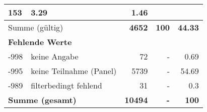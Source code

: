 \begin{longtable}{lXrrr}
       \num{153} &
       \num[round-mode=places,round-precision=2]{3.29} &
         \num[round-mode=places,round-precision=2]{1.46} \\
     \midrule
     \multicolumn{2}{l}{Summe (gültig)} &
       \textbf{\num{4652}} &
     \textbf{\num{100}} &
       \textbf{\num[round-mode=places,round-precision=2]{44.33}} \\
     \multicolumn{5}{l}{\textbf{Fehlende Werte}}\\
       -998 &
       keine Angabe &
         \num{72} &
        - &
         \num[round-mode=places,round-precision=2]{0.69} \\
       -995 &
       keine Teilnahme (Panel) &
         \num{5739} &
        - &
         \num[round-mode=places,round-precision=2]{54.69} \\
       -989 &
       filterbedingt fehlend &
         \num{31} &
        - &
         \num[round-mode=places,round-precision=2]{0.3} \\
     \midrule
     \multicolumn{2}{l}{\textbf{Summe (gesamt)}} &
          \textbf{\num{10494}} &
        \textbf{-} &
        \textbf{\num{100}} \\
     \bottomrule
     \end{longtable}
     
